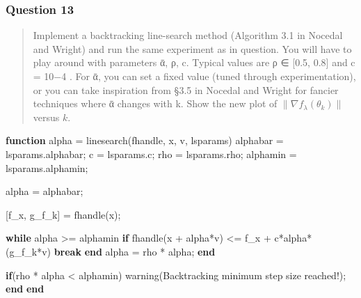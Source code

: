 \documentclass[
]{article}
\newenvironment{Shaded}{}{}
\newcommand{\KeywordTok}[1]{\textcolor[rgb]{0.00,0.44,0.13}{\textbf{#1}}}
\newcommand{\NormalTok}[1]{#1}
\newcommand{\OperatorTok}[1]{\textcolor[rgb]{0.40,0.40,0.40}{#1}}
\newcommand{\SpecialStringTok}[1]{\textcolor[rgb]{0.73,0.40,0.53}{#1}}
\newcommand{\VariableTok}[1]{\textcolor[rgb]{0.10,0.09,0.49}{#1}}
\begin{document}
\hypertarget{question-13}{%
\subsubsection{Question 13}\label{question-13}}

\begin{quote}
Implement a backtracking line-search method (Algorithm 3.1 in Nocedal
and Wright) and run the same experiment as in question. You will have to
play around with parameters ᾱ, ρ, c. Typical values are ρ ∈ {[}0.5,
0.8{]} and c = 10−4 . For ᾱ, you can set a fixed value (tuned through
experimentation), or you can take inspiration from §3.5 in Nocedal and
Wright for fancier techniques where ᾱ changes with k. Show the new plot
of \(\lVert\nabla  f_\lambda (\theta_k )\rVert\) versus \(k\).
\end{quote}

\begin{Shaded}
\begin{Highlighting}[]
\KeywordTok{function} \VariableTok{alpha} \OperatorTok{=} \VariableTok{linesearch}\NormalTok{(}\VariableTok{fhandle}\OperatorTok{,} \VariableTok{x}\OperatorTok{,} \VariableTok{v}\OperatorTok{,} \VariableTok{lsparams}\NormalTok{)}
    \VariableTok{alphabar} \OperatorTok{=} \VariableTok{lsparams}\NormalTok{.}\VariableTok{alphabar}\OperatorTok{;}
    \VariableTok{c} \OperatorTok{=} \VariableTok{lsparams}\NormalTok{.}\VariableTok{c}\OperatorTok{;}
    \VariableTok{rho} \OperatorTok{=} \VariableTok{lsparams}\NormalTok{.}\VariableTok{rho}\OperatorTok{;}
    \VariableTok{alphamin} \OperatorTok{=} \VariableTok{lsparams}\NormalTok{.}\VariableTok{alphamin}\OperatorTok{;}
    
    \VariableTok{alpha} \OperatorTok{=} \VariableTok{alphabar}\OperatorTok{;}

\NormalTok{    [}\VariableTok{f\_x}\OperatorTok{,} \VariableTok{g\_f\_k}\NormalTok{] }\OperatorTok{=} \VariableTok{fhandle}\NormalTok{(}\VariableTok{x}\NormalTok{)}\OperatorTok{;}

    \KeywordTok{while} \VariableTok{alpha} \OperatorTok{\textgreater{}=} \VariableTok{alphamin}
        \KeywordTok{if} \VariableTok{fhandle}\NormalTok{(}\VariableTok{x} \OperatorTok{+} \VariableTok{alpha}\OperatorTok{*}\VariableTok{v}\NormalTok{) }\OperatorTok{\textless{}=} \VariableTok{f\_x} \OperatorTok{+} \VariableTok{c}\OperatorTok{*}\VariableTok{alpha}\OperatorTok{*}\NormalTok{(}\VariableTok{g\_f\_k}\OperatorTok{\textquotesingle{}*}\VariableTok{v}\NormalTok{)}
            \KeywordTok{break}
        \KeywordTok{end}
        \VariableTok{alpha} \OperatorTok{=} \VariableTok{rho} \OperatorTok{*} \VariableTok{alpha}\OperatorTok{;}
    \KeywordTok{end}
    
    \KeywordTok{if}\NormalTok{(}\VariableTok{rho} \OperatorTok{*} \VariableTok{alpha} \OperatorTok{\textless{}} \VariableTok{alphamin}\NormalTok{)}
        \VariableTok{warning}\NormalTok{(}\SpecialStringTok{\textquotesingle{}Backtracking minimum step size reached!\textquotesingle{}}\NormalTok{)}\OperatorTok{;}
    \KeywordTok{end}
\KeywordTok{end}
\end{Highlighting}
\end{Shaded}
\end{document}
